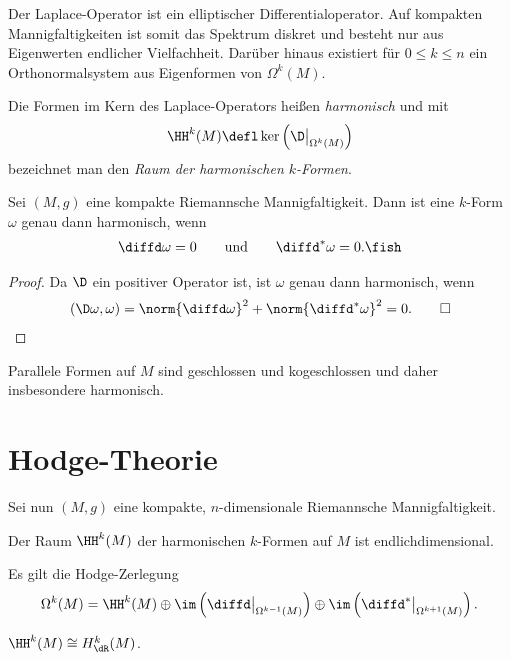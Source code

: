 \documentclass[%
	paper=a5,%
	fleqn,%
	DIV=18,%
	BCOR=0mm,
	fontsize=11pt,
	titlepage=false,%
	bibliography=totoc,
	DIV=18,%
	twoside=true,
	pdftitle=Riemannsche Geometrie,
	pdfauthor=Uwe Semmelmann,
	numbers=noendperiod]%
	{scrbook}
\begin{document}
\begin{rem}
Der Laplace-Operator ist ein elliptischer Differentialoperator. Auf kompakten Mannigfaltigkeiten ist somit das Spektrum diskret und besteht nur aus Eigenwerten endlicher Vielfachheit. Darüber hinaus existiert für $0\le k \le n$ ein Orthonormalsystem aus Eigenformen von $\Omega^k(M)$.\map
\end{rem}

\begin{defn}
Die Formen im Kern des Laplace-Operators heißen \emph{harmonisch} und mit
\begin{align*}
\HH^k(M) \defl \ker\left(\D\big|_{\Omega^k(M)} \right)
\end{align*}
bezeichnet man den \emph{Raum der harmonischen $k$-Formen}.\fish
\end{defn}

\begin{lem}
Sei $(M,g)$ eine kompakte Riemannsche Mannigfaltigkeit. Dann ist eine $k$-Form $\omega$ genau dann harmonisch, wenn
\begin{align*}
\diffd\omega = 0\qquad \text{und}\qquad \diffd^*\omega = 0.\fish
\end{align*}
\end{lem}
\begin{proof}
Da $\D$ ein positiver Operator ist, ist $\omega$ genau dann harmonisch, wenn
\begin{align*}
(\D\omega,\omega) = \norm{\diffd\omega}^2 + \norm{\diffd^*\omega}^2 = 0.\qed
\end{align*}
\end{proof}

\begin{rem}
Parallele Formen auf $M$ sind geschlossen und kogeschlossen und daher insbesondere harmonisch.\map
\end{rem}

\section{Hodge-Theorie}

Sei nun $(M,g)$ eine kompakte, $n$-dimensionale Riemannsche Mannigfaltigkeit. 

\begin{prop}
\begin{propenum}
\item Der Raum $\HH^k(M)$ der harmonischen $k$-Formen auf $M$ ist endlichdimensional.
\item Es gilt die Hodge-Zerlegung
\begin{align*}
\Omega^k(M) = \HH^k(M)\oplus \im \left(\diffd\big|_{\Omega^{k-1}(M)}\right)
\oplus \im \left(\diffd^*\big|_{\Omega^{k+1}(M)}\right).
\end{align*}
\item $\HH^k(M) \cong H_{\dR}^k(M)$.\fish
\end{propenum}
\end{prop}
\end{document}
